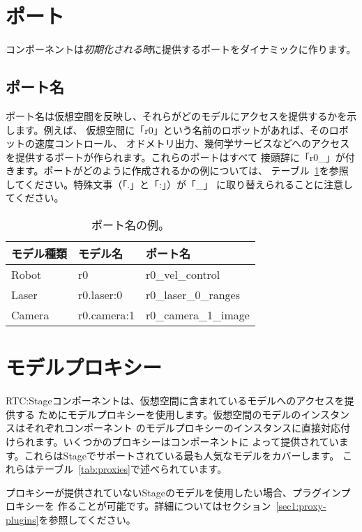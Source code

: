 \documentclass[a4paper,10pt]{article}
\newenvironment{Japanese}{%
  \CJKfamily{min}%
  \CJKtilde
  \CJKnospace}{}
\begin{document}
\begin{CJK}{UTF8}{}
\begin{Japanese}
\section{ポート}
\label{sec:port}

コンポーネントは\emph{初期化される時}に提供するポートをダイナミックに作ります。

\subsection{ポート名}
\label{sec1:naming}

ポート名は仮想空間を反映し、それらがどのモデルにアクセスを提供するかを示します。例えば、
仮想空間に「r0」という名前のロボットがあれば、そのロボットの速度コントロール、
オドメトリ出力、幾何学サービスなどへのアクセスを提供するポートが作られます。これらのポートはすべて
接頭辞に「r0\_」が付きます。ポートがどのように作成されるかの例については、
テーブル~\ref{tab:port_naming}を参照してください。特殊文事（「.」と「:」）が「\_」
に取り替えられることに注意してください。

\begin{table}[t]
  \centering
  \begin{tabular}{lll}
    \toprule
    モデル種類 & モデル名 & ポート名 \\
    \midrule
    Robot & r0 & r0\_vel\_control \\
    Laser & r0.laser:0 & r0\_laser\_0\_ranges \\
    Camera & r0.camera:1 & r0\_camera\_1\_image \\
    \bottomrule
  \end{tabular}
  \caption{ポート名の例。}
  \label{tab:port_naming}
\end{table}

\section{モデルプロキシー}
\label{sec:model-proxies}

RTC:Stageコンポーネントは、仮想空間に含まれているモデルへのアクセスを提供する
ためにモデルプロキシーを使用します。仮想空間のモデルのインスタンスはそれぞれコンポーネント
のモデルプロキシーのインスタンスに直接対応付けられます。いくつかのプロキシーはコンポーネントに
よって提供されています。これらはStageでサポートされている最も人気なモデルをカバーします。
これらはテーブル~\ref{tab:proxies}で述べられています。

プロキシーが提供されていないStageのモデルを使用したい場合、プラグインプロキシーを
作ることが可能です。詳細についてはセクション~\ref{sec1:proxy-plugins}を参照してください。


\end{Japanese}
\end{CJK}
\end{document}
